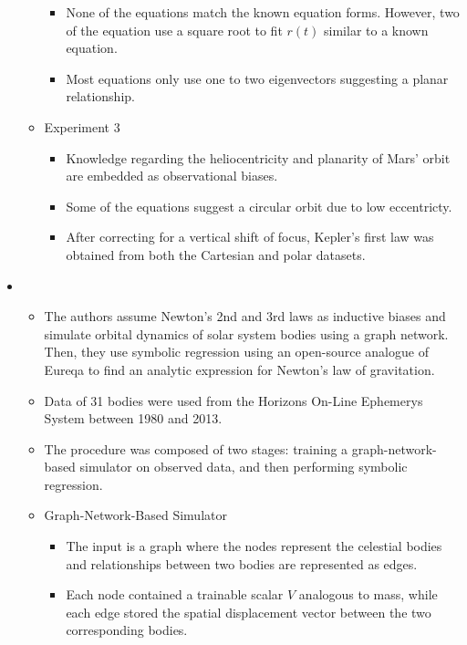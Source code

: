 \documentclass[fleqn,10pt]{olplainarticle}
\begin{document}
\begin{itemize}
\begin{itemize}
\begin {itemize}
                        \item None of the equations match the known equation forms. However, two of the equation use a square root to fit $r(t)$ similar to a known equation.
                        \item Most equations only use one to two eigenvectors suggesting a planar relationship.
                    \end{itemize}
              \item Experiment 3
                    \begin{itemize}
                        \item Knowledge regarding the heliocentricity and planarity of Mars' orbit are embedded as observational biases.
                        \item Some of the equations suggest a circular orbit due to low eccentricty.
                        \item After correcting for a vertical shift of focus, Kepler's first law was obtained from both the Cartesian and polar datasets.
                    \end{itemize}
          \end{itemize}
    \item {}
          \begin{itemize}
              \item The authors assume Newton's 2nd and 3rd laws as inductive biases and simulate orbital dynamics of solar system bodies using a graph network. Then, they use symbolic regression using an open-source analogue of Eureqa to find an analytic expression for Newton's law of gravitation.
              \item Data of 31 bodies were used from the Horizons On-Line Ephemerys System between 1980 and 2013.
              \item The procedure was composed of two stages: training a graph-network-based simulator on observed data, and then performing symbolic regression.
              \item Graph-Network-Based Simulator
                    \begin{itemize}
                        \item The input is a graph where the nodes represent the celestial bodies and relationships between two bodies are represented as edges.
                        \item Each node contained a trainable scalar $V$ analogous to mass, while each edge stored the spatial displacement vector between the two corresponding bodies.

\end{itemize}
\end{itemize}
\end{itemize}
\end{document}
